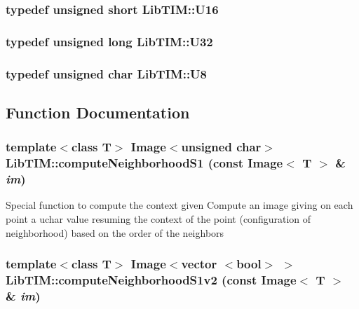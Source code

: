 \subsubsection{\setlength{\rightskip}{0pt plus 5cm}typedef unsigned short {\bf Lib\-TIM::U16}}\label{namespaceLibTIM_a4}


\subsubsection{\setlength{\rightskip}{0pt plus 5cm}typedef unsigned long {\bf Lib\-TIM::U32}}\label{namespaceLibTIM_a6}


\subsubsection{\setlength{\rightskip}{0pt plus 5cm}typedef unsigned char {\bf Lib\-TIM::U8}}\label{namespaceLibTIM_a2}




\subsection{Function Documentation}
\subsubsection{\setlength{\rightskip}{0pt plus 5cm}template$<$class T$>$ {\bf Image}$<$unsigned char$>$ Lib\-TIM::compute\-Neighborhood\-S1 (const Image$<$ T $>$ \& {\em im})}\label{namespaceLibTIM_a18}


Special function to compute the context given Compute an image giving on each point a uchar value resuming the context of the point (configuration of neighborhood) based on the order of the neighbors 
\subsubsection{\setlength{\rightskip}{0pt plus 5cm}template$<$class T$>$ {\bf Image}$<$vector $<$bool$>$ $>$ Lib\-TIM::compute\-Neighborhood\-S1v2 (const Image$<$ T $>$ \& {\em im})}\label{namespaceLibTIM_a19}


